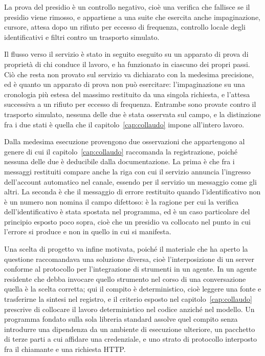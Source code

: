 La prova del presidio è un controllo negativo, cioè una verifica che fallisce se il presidio viene rimosso, e appartiene a una suite che esercita anche impaginazione, cursore, attesa dopo un rifiuto per eccesso di frequenza, controllo locale degli identificativi e filtri contro un trasporto simulato.

Il flusso verso il servizio è stato in seguito eseguito su un apparato di prova di proprietà di chi conduce il lavoro, e ha funzionato in ciascuno dei propri passi. Ciò che resta non provato sul servizio va dichiarato con la medesima precisione, ed è quanto un apparato di prova non può esercitare: l'impaginazione su una cronologia più estesa del massimo restituito da una singola richiesta, e l'attesa successiva a un rifiuto per eccesso di frequenza. Entrambe sono provate contro il trasporto simulato, nessuna delle due è stata osservata sul campo, e la distinzione fra i due stati è quella che il capitolo~\ref{cap:collaudo} impone all'intero lavoro.

Dalla medesima esecuzione provengono due osservazioni che appartengono al genere di cui il capitolo~\ref{cap:collaudo} raccomanda la registrazione, poiché nessuna delle due è deducibile dalla documentazione. La prima è che fra i messaggi restituiti compare anche la riga con cui il servizio annuncia l'ingresso dell'account automatico nel canale, essendo per il servizio un messaggio come gli altri. La seconda è che il messaggio di errore restituito quando l'identificativo non è un numero non nomina il campo difettoso: è la ragione per cui la verifica dell'identificativo è stata spostata nel programma, ed è un caso particolare del principio esposto poco sopra, cioè che un presidio va collocato nel punto in cui l'errore si produce e non in quello in cui si manifesta.

Una scelta di progetto va infine motivata, poiché il materiale che ha aperto la questione raccomandava una soluzione diversa, cioè l'interposizione di un server conforme al protocollo per l'integrazione di strumenti in un agente. In un agente residente che debba invocare quello strumento nel corso di una conversazione quella è la scelta corretta; qui il compito è deterministico, cioè leggere una fonte e trasferirne la sintesi nel registro, e il criterio esposto nel capitolo~\ref{cap:collaudo} prescrive di collocare il lavoro deterministico nel codice anziché nel modello. Un programma fondato sulla sola libreria standard assolve quel compito senza introdurre una dipendenza da un ambiente di esecuzione ulteriore, un pacchetto di terze parti a cui affidare una credenziale, e uno strato di protocollo interposto fra il chiamante e una richiesta HTTP.

